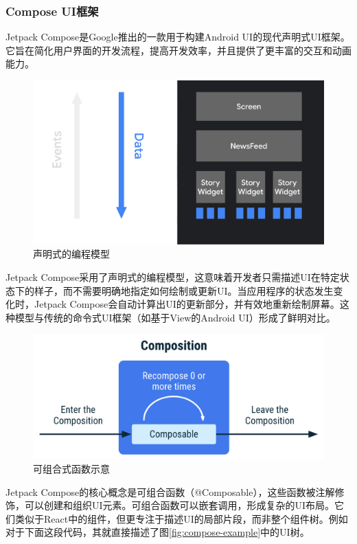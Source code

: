 \documentclass[main.tex]{subfiles}
\begin{document}
\subsubsection{Compose UI框架}

Jetpack Compose是Google推出的一款用于构建Android UI的现代声明式UI框架。它旨在简化用户界面的开发流程，提高开发效率，并且提供了更丰富的交互和动画能力。\cite{compose_docs}

\begin{figure}
    \centering
    \includegraphics[width=0.9\linewidth]{assets/declarative.png}
    \caption{声明式的编程模型}
    \label{fig:declarative}
\end{figure}

Jetpack Compose采用了声明式的编程模型，这意味着开发者只需描述UI在特定状态下的样子，而不需要明确地指定如何绘制或更新UI。当应用程序的状态发生变化时，Jetpack Compose会自动计算出UI的更新部分，并有效地重新绘制屏幕。这种模型与传统的命令式UI框架（如基于View的Android UI）形成了鲜明对比。

\begin{figure}[htbp]
    \centering
    \includegraphics[width=0.9\linewidth]{assets/composition.png}
    \caption{可组合式函数示意}
    \label{fig:composition}
\end{figure}

Jetpack Compose的核心概念是可组合函数（@Composable），这些函数被注解修饰，可以创建和组织UI元素。可组合函数可以嵌套调用，形成复杂的UI布局。它们类似于React中的组件，但更专注于描述UI的局部片段，而非整个组件树。例如对于下面这段代码，其就直接描述了图\ref{fig:compose-example}中的UI树。
\end{document}
